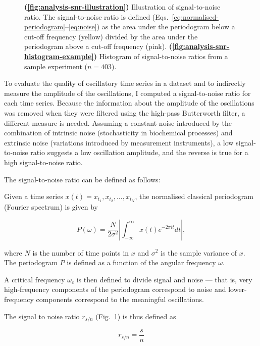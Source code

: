 \begin{figure}
  \caption{
    \textbf{(\ref{fig:analysis-snr-illustration})}
    Illustration of signal-to-noise ratio.
    The signal-to-noise ratio is defined (Eqs.\ \ref{eq:normalised-periodogram}--\ref{eq:noise}) as the area under the periodogram below a cut-off frequency (yellow) divided by the area under the periodogram above a cut-off frequency (pink).
    \textbf{(\ref{fig:analysis-snr-histogram-example})}
    Histogram of signal-to-noise ratios from a sample experiment ($n=403$).
  }
  \label{fig:analysis-snr}
\end{figure}

To evaluate the quality of oscillatory time series in a dataset and to indirectly measure the amplitude of the oscillations, I computed a signal-to-noise ratio for each time series.
Because the information about the amplitude of the oscillations was removed when they were filtered using the high-pass Butterworth filter, a different measure is needed.
Assuming a constant noise introduced by the combination of intrinsic noise (stochasticity in biochemical processes) and extrinsic noise (variations introduced by measurement instruments), a low signal-to-noise ratio suggests a low oscillation amplitude, and the reverse is true for a high signal-to-noise ratio.

The signal-to-noise ratio can be defined as follows:

Given a time series $x(t) = x_{t_{1}}, x_{t_{2}}, \ldots, x_{t_{N}}$, the normalised classical periodogram (Fourier spectrum) is given by

\begin{equation}
  P(\omega) = \frac{N}{2\sigma^{2}} \left|\int_{-\infty}^{\infty} x(t) e^{-2\pi it}dt \right|, %
  \label{eq:normalised-periodogram}
\end{equation}

where $N$ is the number of time points in $x$ and $\sigma^{2}$ is the sample variance of $x$.
The periodogram $P$ is defined as a function of the angular frequency $\omega$.

A critical frequency $\omega_{c}$ is then defined to divide signal and noise --- that is, very high-frequency components of the periodogram correspond to noise and lower-frequency components correspond to the meaningful oscillations.

The signal to noise ratio $r_{s/n}$ (Fig.\ \ref{fig:analysis-snr}) is thus defined as

\begin{equation}
  r_{s/n} = \frac{s}{n}
  \label{eq:snr}
\end{equation}

